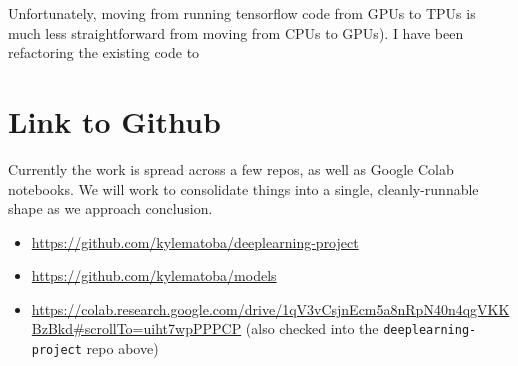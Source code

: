 \documentclass[10pt,twocolumn,letterpaper]{article}
\begin{document}
Unfortunately, moving from running tensorflow code from GPUs to TPUs is much less straightforward from moving from CPUs to GPUs). I have been refactoring the existing code to 


\section{Link to Github}
Currently the work is spread across a few repos, as well as Google Colab notebooks. We will work to consolidate things into a single, cleanly-runnable shape as we approach conclusion.

\begin{itemize}
\item \url{https://github.com/kylematoba/deeplearning-project}
\item \url{https://github.com/kylematoba/models}
\item \url{https://colab.research.google.com/drive/1qV3vCsjnEcm5a8nRpN40n4qgVKKBzBkd#scrollTo=uiht7wpPPPCP} (also checked into the \texttt{deeplearning-project} repo above)
\end{itemize}


\nocite{Torralba2008}
{\small


}
\end{document}
